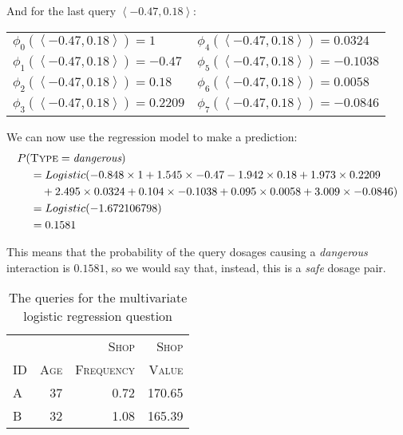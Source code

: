\documentclass[--SOLUTION-OPTION--]{ditpaper}
\begin{document}
\begin{enumerate}
\begin{answer}
And for the last query $\left<-0.47, 0.18\right>$:
			\begin{center}
\begin{tabular}[ht]{ l  l  }
$\phi_0(\left<-0.47, 0.18\right>) =  1$ & $\phi_4(\left<-0.47, 0.18\right>) = 0.0324$ \\
$\phi_1(\left<-0.47, 0.18\right>) = -0.47$ & $\phi_5(\left<-0.47, 0.18\right>) = -0.1038$ \\
$\phi_2(\left<-0.47, 0.18\right>) = 0.18$ &$\phi_6(\left<-0.47, 0.18\right>) = 0.0058$  \\
$\phi_3(\left<-0.47, 0.18\right>) = 0.2209$ & $\phi_7(\left<-0.47, 0.18\right>) = -0.0846$ \\
\end{tabular}
\end{center}
	We can now use the regression model to make a prediction:
		\begin{alignat*}{2}				
P(&\textsc{Type}=\textit{dangerous}) \\
& = Logistic(-0.848\times 1 + 1.545 \times -0.47 -1.942 \times  0.18 + 1.973 \times 0.2209 \\
&  ~~~  +  2.495   \times 0.0324 + 0.104 \times -0.1038 + 0.095 \times 0.0058 + 3.009\times -0.0846) \\
& = Logistic(-1.672106798)  \\
& = 0.1581 
\end{alignat*}
 
\noindent This means that the probability of the query dosages causing a \textit{dangerous} interaction is $0.1581$, so we would say that, instead, this is a \textit{safe} dosage pair. 
		\end{answer}
		\end{enumerate}

\clearpage

\begin{table}[htb]
\caption{The queries for the multivariate logistic regression question}
\label{tab:logregress}
\begin{center}
\begin{tabular}{l r r r}
\hline
			 & ~ & \textsc{Shop}  & \textsc{Shop}\\
				\textsc{ID} & \textsc{Age} & \textsc{Frequency}  & \textsc{Value}\\
\hline
A & 37 & 0.72 & 170.65 \\ 
B & 32 & 1.08 & 165.39 \\ 
\hline
\end{tabular}
\end{center}
\end{table}
\end{document}
